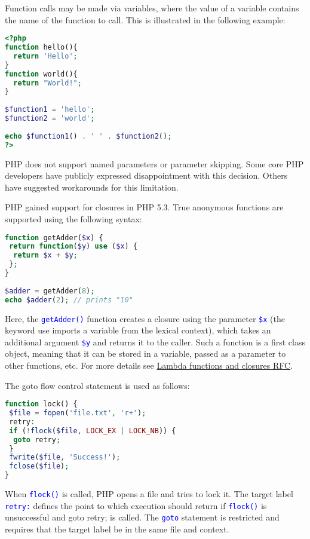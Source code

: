 Function calls may be made via variables, where the value of a variable contains the name of the function to call. This is illustrated in the following example:

\begin{lstlisting}[language=PHP]
<?php
function hello(){
  return 'Hello';
}
function world(){
  return "World!";
}
 
$function1 = 'hello';
$function2 = 'world';
 
echo $function1() . ' ' . $function2();
?>
\end{lstlisting}

PHP does not support named parameters or parameter skipping. Some core PHP developers have publicly expressed disappointment with this decision. Others have suggested workarounds for this limitation.

PHP gained support for closures in PHP 5.3. True anonymous functions are supported using the following syntax:


\begin{lstlisting}[language=PHP]
function getAdder($x) {
 return function($y) use ($x) {
  return $x + $y;
 };
}
 
$adder = getAdder(8);
echo $adder(2); // prints "10"
\end{lstlisting}


Here, the  \textcolor{Blue}{\texttt{getAdder()}} function creates a closure using the parameter  \textcolor{Blue}{\texttt{\$x}} (the keyword use imports a variable from the lexical context), which takes an additional argument  \textcolor{Blue}{\texttt{\$y}} and returns it to the caller. Such a function is a first class object, meaning that it can be stored in a variable, passed as a parameter to other functions, etc. For more details see \href{http://wiki.php.net/rfc/closures}{Lambda functions and closures RFC}.


The goto flow control statement is used as follows:

\begin{lstlisting}[language=PHP]
function lock() {
 $file = fopen('file.txt', 'r+');
 retry:
 if (!flock($file, LOCK_EX | LOCK_NB)) {
  goto retry;
 }
 fwrite($file, 'Success!');
 fclose($file);
}
\end{lstlisting}


When \textcolor{Blue}{\texttt{flock()}} is called, PHP opens a file and tries to lock it. The target label \textcolor{Blue}{\texttt{retry:}} defines the point to which execution should return if \textcolor{Blue}{\texttt{flock()}} is unsuccessful and goto retry; is called. The \textcolor{Blue}{\texttt{goto}} statement is restricted and requires that the target label be in the same file and context.

